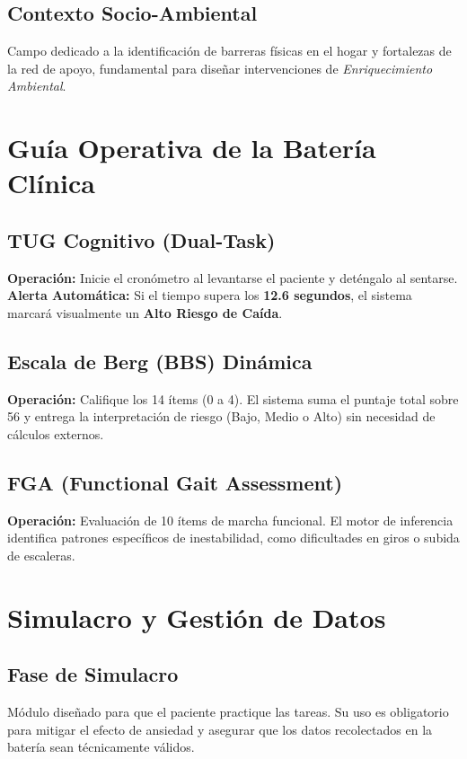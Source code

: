 \documentclass[12pt,a4paper]{article}
\begin{document}
\subsection{Contexto Socio-Ambiental}
Campo dedicado a la identificación de barreras físicas en el hogar y fortalezas de la red de apoyo, fundamental para diseñar intervenciones de \textit{Enriquecimiento Ambiental}.

\section{Guía Operativa de la Batería Clínica}

\subsection{TUG Cognitivo (Dual-Task)}
\textbf{Operación:} Inicie el cronómetro al levantarse el paciente y deténgalo al sentarse. 
\textbf{Alerta Automática:} Si el tiempo supera los \textbf{12.6 segundos}, el sistema marcará visualmente un \textbf{Alto Riesgo de Caída}.

\subsection{Escala de Berg (BBS) Dinámica}
\textbf{Operación:} Califique los 14 ítems (0 a 4). El sistema suma el puntaje total sobre 56 y entrega la interpretación de riesgo (Bajo, Medio o Alto) sin necesidad de cálculos externos.

\subsection{FGA (Functional Gait Assessment)}
\textbf{Operación:} Evaluación de 10 ítems de marcha funcional. El motor de inferencia identifica patrones específicos de inestabilidad, como dificultades en giros o subida de escaleras.

\section{Simulacro y Gestión de Datos}

\subsection{Fase de Simulacro}
Módulo diseñado para que el paciente practique las tareas. Su uso es obligatorio para mitigar el efecto de ansiedad y asegurar que los datos recolectados en la batería sean técnicamente válidos.
\end{document}
